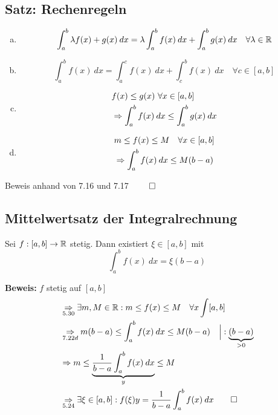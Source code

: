 \documentclass[10pt, a4paper, fleqn]{article}
\begin{document}
\subsection{Satz: Rechenregeln}
\begin{enumerate}[a)]
    \abovedisplayskip = -\baselineskip
    \item \[
        \int_a^b \lambda f(x) + g(x) \:dx = \lambda \int_a^b f(x) \:dx + \int_a^b g(x) \:dx \quad \forall \lambda \in \mathbb{R}
    \]
    \item \[
        \int_a^b f(x) \:dx = \int_a^c f(x) \:dx + \int_c^b f(x) \:dx \quad \forall c \in [a, b]    
    \]
    \item \[\begin{aligned}
        & f(x) \leq g(x) \ \forall x \in [a, b] \\
        & \Rightarrow \int_a^b f(x) \:dx \leq \int_a^b g(x) \:dx    
    \end{aligned}\]
    \item \[\begin{aligned}
        &m \leq f(x) \leq M \quad \forall x \in [a, b] \\
        &\Rightarrow \int_a^b f(x) \:dx \leq M(b - a)
    \end{aligned}\]
\end{enumerate}
Beweis anhand von 7.16 und 7.17 $\qed$

\subsection{Mittelwertsatz der Integralrechnung}
Sei $f: [a, b] \to \mathbb{R}$ stetig. Dann existiert $\xi \in [a, b]$ mit
\[
    \int_a^b f(x) \:dx = \xi(b - a)    
\]

\textbf{Beweis: } $f$ stetig auf $[a, b]$
\[\begin{aligned}
    &\underset{5.30}{\Rightarrow} \exists m, M \in \mathbb{R}: m \leq f(x) \leq M \quad \forall x \int [a, b] \\
    &\underset{7.22d}{\Rightarrow} m(b - a) \leq \int_a^b f(x) \:dx \leq M(b - a) \quad \Big|:\underbrace{(b - a)}_{> 0} \\
    &\Rightarrow m \leq \underbrace{\frac{1}{b - a} \int_a^b f(x) \:dx}_y \leq M \\
    &\underset{5.24}{\Rightarrow} \exists \xi \in [a, b]: f(\xi)y = \frac{1}{b - a} \int_a^b f(x) \:dx \qed
\end{aligned}\]
\ifdefined\MAINDOC\else
\end{document}

